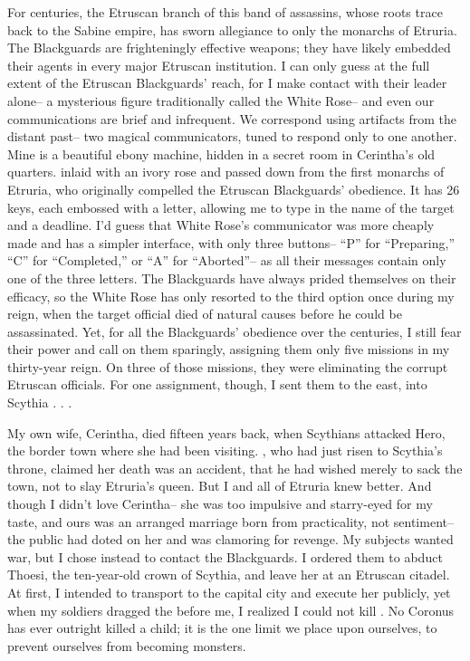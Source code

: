 \documentclass[char]{Kos}
\begin{document}
For centuries, the Etruscan branch of this band of assassins, whose roots trace back to the Sabine empire, has sworn allegiance to only the monarchs of Etruria. The Blackguards are frighteningly effective weapons; they have likely embedded their agents in every major Etruscan institution. I can only guess at the full extent of the Etruscan Blackguards' reach, for I make contact with their leader alone-- a mysterious figure traditionally called the White Rose-- and even our communications are brief and infrequent. We correspond using artifacts from the distant past-- two magical communicators, tuned to respond only to one another. Mine is a beautiful ebony machine, hidden in a secret room in Cerintha's old quarters. inlaid with an ivory rose and passed down from the first monarchs of Etruria, who originally compelled the Etruscan Blackguards' obedience. It has 26 keys, each embossed with a letter, allowing me to type in the name of the target and a deadline. I'd guess that White Rose's communicator was more cheaply made and has a simpler interface, with only three buttons-- ``P'' for ``Preparing,'' ``C'' for ``Completed,'' or ``A'' for ``Aborted''-- as all their messages contain only one of the three letters. The Blackguards have always prided themselves on their efficacy, so the White Rose has only resorted to the third option once during my reign, when the target official died of natural causes before he could be assassinated. Yet, for all the Blackguards' obedience over the centuries, I still fear their power and call on them sparingly, assigning them only five missions in my thirty-year reign. On three of those missions, they were eliminating the corrupt Etruscan officials. For one assignment, though, I sent them to the east, into Scythia . . .

My own wife, Cerintha, died fifteen years back, when Scythians attacked Hero, the border town where she had been visiting. \cScythiaKing{\Monarch} \cScythiaKing{}, who had just risen to Scythia's throne, claimed her death was an accident, that he had wished merely to sack the town, not to slay Etruria's queen. But I and all of Etruria knew better. And though I didn't love Cerintha-- she was too impulsive and starry-eyed for my taste, and ours was an arranged marriage born from practicality, not sentiment-- the public had doted on her and was clamoring for revenge. My subjects wanted war, but I chose instead to contact the Blackguards. I ordered them to abduct Thoesi, the ten-year-old crown \cFugitive{\prince} of Scythia, and leave her at an Etruscan citadel. At first, I intended to transport \cFugitive{\them} to the capital city and execute her publicly, yet when my soldiers dragged the \cFugitive{\kid} before me, I realized I could not kill \cFugitive{\them}. No Coronus has ever outright killed a child; it is the one limit we place upon ourselves, to prevent ourselves from becoming monsters.
\end{document}
